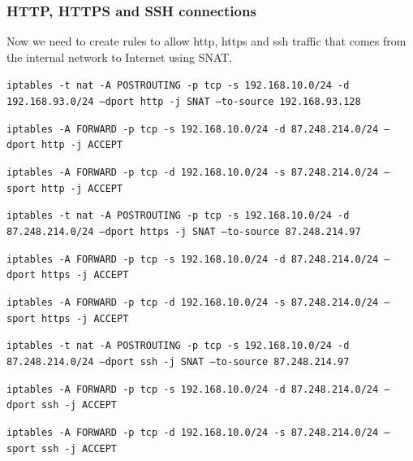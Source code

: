 \documentclass{article}
\begin{document}
\subsubsection{HTTP, HTTPS and SSH connections}
\texttt{}\par Now we need to create rules to allow http, https and ssh traffic that comes from the internal network to Internet using SNAT.

\texttt{}\par
\texttt{iptables -t nat -A POSTROUTING -p tcp -s 192.168.10.0/24 -d 192.168.93.0/24 --dport http -j SNAT --to-source 192.168.93.128 }\par
\texttt{iptables -A FORWARD -p tcp -s 192.168.10.0/24 -d 87.248.214.0/24   --dport http -j ACCEPT}\par
\texttt{iptables -A FORWARD -p tcp -d 192.168.10.0/24 -s 87.248.214.0/24   --sport http -j ACCEPT}\par
\texttt{}\par
\texttt{}\par
\texttt{iptables -t nat -A POSTROUTING -p tcp -s 192.168.10.0/24 -d  87.248.214.0/24 --dport https -j SNAT --to-source 87.248.214.97}\par
\texttt{iptables -A FORWARD -p tcp -s 192.168.10.0/24 -d 87.248.214.0/24   --dport https -j ACCEPT}\par
\texttt{iptables -A FORWARD -p tcp -d 192.168.10.0/24 -s 87.248.214.0/24   --sport https -j ACCEPT}\par
\texttt{}\par
\texttt{}\par
\texttt{iptables -t nat -A POSTROUTING -p tcp -s 192.168.10.0/24 -d  87.248.214.0/24 --dport ssh -j SNAT --to-source 87.248.214.97}\par
\texttt{iptables -A FORWARD -p tcp -s 192.168.10.0/24 -d 87.248.214.0/24   --dport ssh -j ACCEPT}\par
\texttt{iptables -A FORWARD -p tcp -d 192.168.10.0/24 -s 87.248.214.0/24   --sport ssh -j ACCEPT}\par
\texttt{}\par
\end{document}

